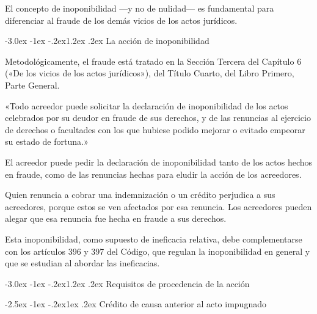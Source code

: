 \documentclass[12pt,oneside]{book}
\makeatletter
\renewcommand\section{\@startsection{section}{1}{\z@}%
  {-3.0ex \@plus -1ex \@minus -.2ex}{1.2ex \@plus .2ex}%
  {\normalfont\large\bfseries\color{acento}}}
\renewcommand\subsection{\@startsection{subsection}{2}{\z@}%
  {-2.5ex \@plus -1ex \@minus -.2ex}{1ex \@plus .2ex}%
  {\normalfont\normalsize\bfseries}}
\makeatother
\begin{document}
\begin{importante}
El concepto de inoponibilidad ---y no de nulidad--- es fundamental para diferenciar al fraude de los demás vicios de los actos jurídicos.
\end{importante}

\section{La acción de inoponibilidad}

Metodológicamente, el fraude está tratado en la Sección Tercera del Capítulo 6 («De los vicios de los actos jurídicos»), del Título Cuarto, del Libro Primero, Parte General.

\begin{regla}
«Todo acreedor puede solicitar la declaración de inoponibilidad de los actos celebrados por su deudor en fraude de sus derechos, y de las renuncias al ejercicio de derechos o facultades con los que hubiese podido mejorar o evitado empeorar su estado de fortuna.»
\end{regla}

El acreedor puede pedir la declaración de inoponibilidad tanto de los actos hechos en fraude, como de las renuncias hechas para eludir la acción de los acreedores.

\begin{ejemplo}
Quien renuncia a cobrar una indemnización o un crédito perjudica a sus acreedores, porque estos se ven afectados por esa renuncia. Los acreedores pueden alegar que esa renuncia fue hecha en fraude a sus derechos.
\end{ejemplo}

\begin{nota}
Esta inoponibilidad, como supuesto de ineficacia relativa, debe complementarse con los artículos 396 y 397 del Código, que regulan la inoponibilidad en general y que se estudian al abordar las ineficacias.
\end{nota}

\section{Requisitos de procedencia de la acción}

\subsection{Crédito de causa anterior al acto impugnado}
\end{document}
